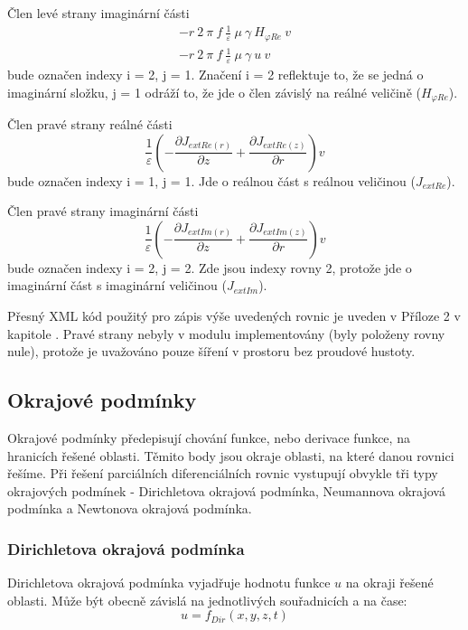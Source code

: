 \documentclass[12pt,a4paper,oneside]{article}
\numberwithin{equation}{section} %
\numberwithin{figure}{section} %
\numberwithin{table}{section} %
\begin{document}
Člen levé strany imaginární části
\begin{subequations}
\begin{gather}
- r ~ 2 ~ \pi ~ f ~ \frac{1}{\varepsilon} ~ \mu ~ \gamma ~ H _{\varphi Re} ~ v
\\
- r ~ 2 ~ \pi ~ f ~ \frac{1}{\varepsilon} ~ \mu ~ \gamma ~ u ~ v
\end{gather}
\end{subequations}
bude označen indexy i = 2, j = 1. Značení i = 2 reflektuje to, že se jedná o imaginární složku, j = 1 odráží to, že jde o člen závislý na reálné veličině ($H _{\varphi Re}$).

Člen pravé strany reálné části
\begin{equation}
\frac{1}{\varepsilon} \left( - \frac{\partial J _{extRe(r)}}{\partial z} + \frac{\partial J _{extRe(z)}}{\partial r} \right) v
\end{equation}
bude označen indexy i = 1, j = 1. Jde o reálnou část s reálnou veličinou ($J _{extRe}$). 

Člen pravé strany imaginární části
\begin{equation}
\frac{1}{\varepsilon} \left( - \frac{\partial J _{extIm(r)}}{\partial z} + \frac{\partial J _{extIm(z)}}{\partial r} \right)  v
\end{equation}
bude označen indexy i = 2, j = 2. Zde jsou indexy rovny 2, protože jde o imaginární část s imaginární veličinou ($J _{extIm}$).

Přesný XML kód použitý pro zápis výše uvedených rovnic je uveden v Příloze 2 v kapitole . Pravé strany nebyly v modulu implementovány (byly položeny rovny nule), protože je uvažováno pouze šíření v prostoru bez proudové hustoty.


\subsection{Okrajové podmínky}
\label{boundary}
Okrajové podmínky předepisují chování funkce, nebo derivace funkce, na hranicích řešené oblasti. Těmito body jsou okraje oblasti, na které danou rovnici řešíme. Při řešení parciálních diferenciálních rovnic vystupují obvykle tři typy okrajových podmínek - Dirichletova okrajová podmínka, Neumannova okrajová podmínka a Newtonova okrajová podmínka.


\subsubsection{Dirichletova okrajová podmínka}
Dirichletova okrajová podmínka vyjadřuje hodnotu funkce $u$ na okraji řešené oblasti. Může být obecně závislá na jednotlivých souřadnicích a na čase: 
\begin{equation}
u = f _{Dir} (x, y, z, t)
\end{equation}
\end{document}
